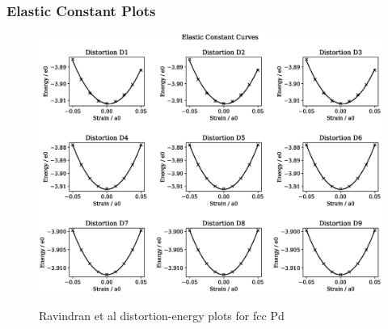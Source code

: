 \clearpage
\subsubsection{Elastic Constant Plots}

\begin{figure}[htb]
\centering
\includegraphics[width=.90\linewidth]{chapters/potentials_fe_pd_ru/fepd_potential/ec_rfkj/elastic_strains_bp_2.eps}  
\label{fig:fepd-pdfcc-distortions}
\caption{Ravindran et al\cite{dfttisiravindran} distortion-energy plots for \acrshort{fcc} Pd}
\end{figure}

